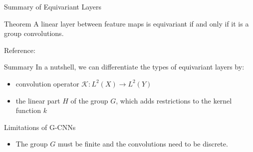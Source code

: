 \documentclass[9pt,dvipsnames]{beamer}
\begin{document}
\begin{frame}{Summary of Equivariant Layers}

	\begin{alertblock}{Theorem}
		A linear layer between feature maps is equivariant if and only if it is a group convolutions.

		Reference: \cite{bekkers_uvagedl}
	\end{alertblock}

	\begin{block}{Summary}
		In a nutshell, we can differentiate the types of equivariant layers by:
		\begin{itemize}
			\item convolution operator $\mathcal{K}: L^2(X) \to L^2(Y)$
			\item the linear part $H$ of the group $G$, which adds restrictions to the kernel function $k$
		\end{itemize}
	\end{block}

	\begin{block}{Limitations of G-CNNs}
		\begin{itemize}
			\item The group $G$ must be finite and the convolutions need to be discrete.
		\end{itemize}
	\end{block}

\end{frame}
\end{document}
